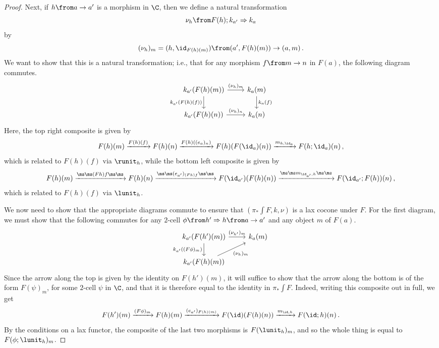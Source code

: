 \begin{proof}
  Next, if $h\from a \to a'$ is a morphism in $\C$, then we define a natural transformation
  \[
    \nu_h \from F(h);k_{a'} \Rightarrow k_a
    \]
  by
  \[
    (\nu_h)_m = (h, \id_{F(h)(m)}) \from (a',F(h)(m)) \to (a,m)\,.
    \]
  We want to show that this is a natural transformation; i.e., that for any morphism $f \from m \to n$ in $F(a)$, the following diagram commutes.
  \[
    \begin{tikzcd}
      k_{a'}(F(h)(m)) \arrow[r, "(\nu_h)_m"] \arrow[d, "k_{a'}(F(h)(f))"']
        & k_a(m) \arrow[d, "k_a(f)"] \\
      k_{a'}(F(h)(n)) \arrow[r, "(\nu_h)_n"]
        & k_a(n)
    \end{tikzcd}
    \]
  Here, the top right composite is given by
  \[
    F(h)(m) \xrightarrow{F(h)(f)}
    F(h)(n) \xrightarrow{F(h)((e_{a})_n)}
    F(h)(F(\id_a)(n)) \xrightarrow{m_{h,\id_a}}
    F(h;\id_a)(n)\,,
    \]
  which is related to $F(h)(f)$ via $\runit_h$, while the bottom left composite is given by
  \[
    F(h)(m) \xrightarrow{\ms\ms(Fh)f\ms\ms}
    F(h)(n) \xrightarrow{\ms\ms(e_{a'})_{(Fh)f}\ms\ms}
    F(\id_{a'})(F(h)(n)) \xrightarrow{\ms\ms m_{\id_{a'},h}\ms\ms}
    F(\id_{a'};F(h))(n)\,,
    \]
  which is related to $F(h)(f)$ via $\lunit_h$.

  We now need to show that the appropriate diagrams commute to ensure that $\left(\pi_*\int F,k,\nu\right)$ is a lax cocone under $F$.
  For the first diagram, we must show that the following commutes for any $2$-cell $\phi\from h' \Rightarrow h\from a \to a'$ and any object $m$ of $F(a)$.
  \[
    \begin{tikzcd}
      k_{a'}(F(h')(m)) \arrow[r, "(\nu_{h'})_m"] \arrow[d, "k_{a'}((F\phi)_m)"']
        & k_a(m) \\
      k_{a'}(F(h)(m)) \arrow[ur, "(\nu_h)_m"']
        &
    \end{tikzcd}
    \]
  Since the arrow along the top is given by the identity on $F(h')(m)$, it will suffice to show that the arrow along the bottom is of the form $F(\psi)_m$, for some $2$-cell $\psi$ in $\C$, and that it is therefore equal to the identity in $\pi_*\int F$.
  Indeed, writing this composite out in full, we get
  \[
    F(h')(m) \xrightarrow{(F\phi)_m}
    F(h)(m) \xrightarrow{(e_{a'})_{F(h)(m)}}
    F(\id)(F(h)(n)) \xrightarrow{m_{\id,h}}
    F(\id;h)(n)\,.
    \]
  By the conditions on a lax functor, the composite of the last two morphisms is $F(\lunit_h)_m$, and so the whole thing is equal to $F(\phi;\lunit_h)_m$.


\end{proof}
